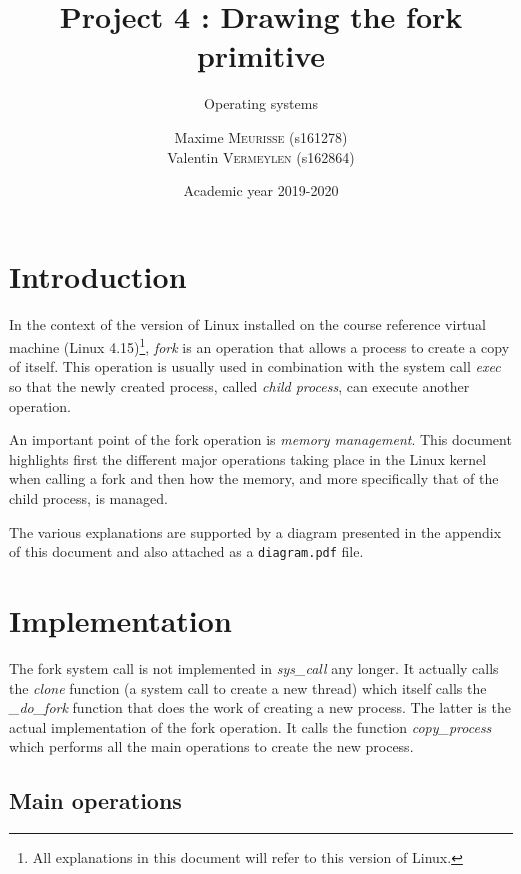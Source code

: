 \documentclass[a4paper, 12pt]{article}
\institute{University of Liège}
\title{Project 4 : Drawing the fork primitive}
\subtitle{Operating systems}
\author{
    Maxime \textsc{Meurisse} (s161278)\\
    Valentin \textsc{Vermeylen} (s162864)\\
}
\date{Academic year 2019-2020}
\begin{document}
    
    \maketitle
    
    
    \section{Introduction}
    
    In the context of the version of Linux installed on the course reference virtual machine (Linux 4.15)\footnote{All explanations in this document will refer to this version of Linux.}, \emph{fork} is an operation that allows a process to create a copy of itself. This operation is usually used in combination with the system call \emph{exec} so that the newly created process, called \emph{child process}, can execute another operation.
    
    An important point of the fork operation is \emph{memory management}. This document highlights first the different major operations taking place in the Linux kernel when calling a fork and then how the memory, and more specifically that of the child process, is managed.
    
    The various explanations are supported by a diagram presented in the appendix of this document and also attached as a \texttt{diagram.pdf} file.
    
    
    \section{Implementation}
    
    The fork system call is not implemented in \emph{sys\_call} any longer. It actually calls the \emph{clone} function (a system call to create a new thread) which itself calls the \emph{\_do\_fork} function that does the work of creating a new process. The latter is the actual implementation of the fork operation. It calls the function \emph{copy\_process} which performs all the main operations to create the new process.
    
    \subsection{Main operations}
    
\end{document}

